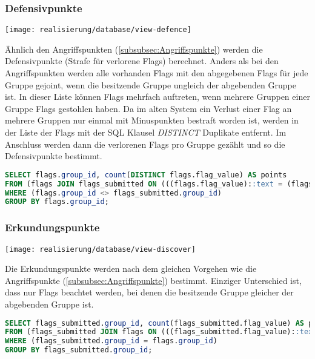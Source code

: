 \subsubsection{Defensivpunkte}
\begin{center}
	\texttt{[image: realisierung/database/view-defence]}
	\label{fig:realisierung-view-defence}
\end{center}

Ähnlich den Angriffspunkten (\ref{subsubsec:Angriffspunkte}) werden die Defensivpunkte (Strafe für verlorene Flags) berechnet.
Anders als bei den Angriffspunkten werden alle vorhanden Flags mit den abgegebenen Flags für jede Gruppe gejoint, wenn die besitzende Gruppe ungleich der abgebenden Gruppe ist. In dieser Liste können Flags mehrfach auftreten, wenn mehrere Gruppen einer Gruppe Flags gestohlen haben. Da im alten System ein Verlust einer Flag an mehrere Gruppen nur einmal mit Minuspunkten bestraft worden ist, werden in der Liste der Flags mit der SQL Klausel \textit{DISTINCT} Duplikate entfernt. Im Anschluss werden dann die verlorenen Flags pro Gruppe gezählt und so die Defensivpunkte bestimmt.

\begin{lstlisting}[frame=single, language=sql, caption={SQL View Denfensivpunkte}, captionpos=b, label={lst:database-defence-points}]
SELECT flags.group_id, count(DISTINCT flags.flag_value) AS points
FROM (flags JOIN flags_submitted ON (((flags.flag_value)::text = (flags_submitted.flag_value)::text)))
WHERE (flags.group_id <> flags_submitted.group_id)
GROUP BY flags.group_id;
\end{lstlisting}

\subsubsection{Erkundungspunkte}
\begin{center}
	\texttt{[image: realisierung/database/view-discover]}
	\label{fig:realisierung-view-discover}
\end{center}

Die Erkundungspunkte werden nach dem gleichen Vorgehen wie die Angriffspunkte (\ref{subsubsec:Angriffspunkte}) bestimmt. Einziger Unterschied ist, dass nur Flags beachtet werden, bei denen die besitzende Gruppe gleicher der abgebenden Gruppe ist.

\begin{lstlisting}[frame=single, language=sql, caption={SQL View Erkundungspunkte}, captionpos=b, label={lst:database-discover-points}]
SELECT flags_submitted.group_id, count(flags_submitted.flag_value) AS points
FROM (flags_submitted JOIN flags ON (((flags_submitted.flag_value)::text = (flags.flag_value)::text)))
WHERE (flags_submitted.group_id = flags.group_id)
GROUP BY flags_submitted.group_id;
\end{lstlisting}


